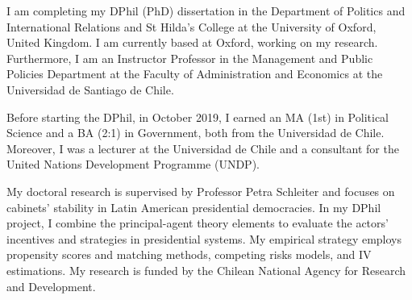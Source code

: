 




\vspace{3mm}

\begin{cvparagraph}

I am completing my DPhil (PhD) dissertation in the Department of Politics and International Relations and St Hilda’s College at the University of Oxford, United Kingdom. I am currently based at Oxford, working on my research. Furthermore, I am an Instructor Professor in the Management and Public Policies Department at the Faculty of Administration and Economics at the Universidad de Santiago de Chile.

Before starting the DPhil, in October 2019, I earned an MA (1st) in Political Science and a BA (2:1) in Government, both from the Universidad de Chile. Moreover, I was a lecturer at the Universidad de Chile and a consultant for the United Nations Development Programme (UNDP). 

My doctoral research is supervised by Professor Petra Schleiter and focuses on cabinets’ stability in Latin American presidential democracies. In my DPhil project, I combine the principal-agent theory elements to evaluate the actors’ incentives and strategies in presidential systems. My empirical strategy employs propensity scores and matching methods, competing risks models, and IV estimations. My research is funded by the Chilean National Agency for Research and Development.
\vspace{1mm}
\end{cvparagraph}

